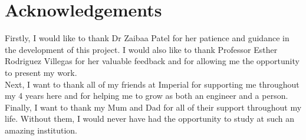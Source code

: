 \section*{Acknowledgements}
Firstly, I would like to thank Dr Zaibaa Patel for her patience and guidance 
in the development of this project. I would also like to thank Professor Esther 
Rodriguez Villegas for her valuable feedback and for allowing me the opportunity to 
present my work.\\ \newline \noindent Next, I want to thank all of my friends at Imperial for supporting me throughout my 4 years here and for 
helping me to grow as both an engineer and a person.\\ \newline \noindent Finally, I want to thank my Mum and Dad for all of their support throughout my life. Without them, I would never have
had the opportunity to study at such an amazing institution.
